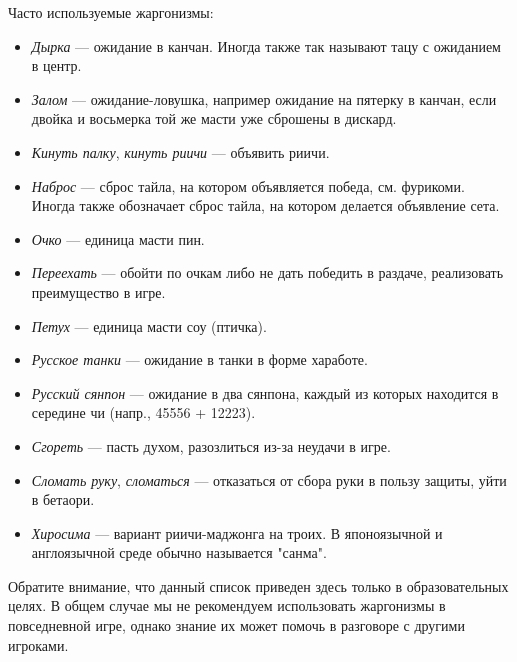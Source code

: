 Часто используемые жаргонизмы:
\begin{itemize}
	\item \textit{Дырка} --- ожидание в канчан. Иногда также так называют тацу с ожиданием в центр.
	\item \textit{Залом} --- ожидание-ловушка, например ожидание на пятерку в канчан, если двойка и восьмерка той же масти уже сброшены в дискард.
	\item \textit{Кинуть палку}, \textit{кинуть риичи} --- объявить риичи.
	\item \textit{Наброс} --- сброс тайла, на котором объявляется победа, см. фурикоми. Иногда также обозначает сброс тайла, на котором делается объявление сета.
	\item \textit{Очко} --- единица масти пин.
	\item \textit{Переехать} --- обойти по очкам либо не дать победить в раздаче, реализовать преимущество в игре.
	\item \textit{Петух} --- единица масти соу (птичка).
	\item \textit{Русское танки} --- ожидание в танки в форме хаработе.
	\item \textit{Русский сянпон} --- ожидание в два сянпона, каждый из которых находится в середине чи (напр., 45556 + 12223).
	\item \textit{Сгореть} --- пасть духом, разозлиться из-за неудачи в игре.
	\item \textit{Сломать руку}, \textit{сломаться} --- отказаться от сбора руки в пользу защиты, уйти в бетаори.
	\item \textit{Хиросима} --- вариант риичи-маджонга на троих. В японоязычной и англоязычной среде обычно называется "санма".
\end{itemize}
	
Обратите внимание, что данный список приведен здесь только в образовательных целях. В общем случае мы не рекомендуем использовать жаргонизмы в повседневной игре, однако знание их может помочь в разговоре с другими игроками.
